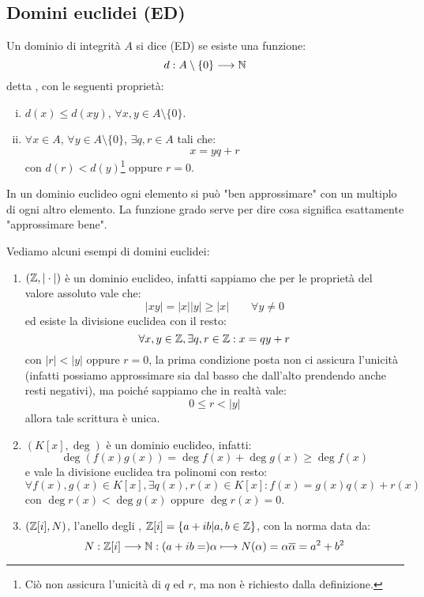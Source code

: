 \documentclass[11pt]{scrartcl}
\begin{document}
\newpage
\subsection{Domini euclidei (ED)}
\begin{definition}
    Un dominio di integrità $A$ si dice  (ED) se esiste una funzione:
    \[ d : A \setminus\{0\} \longrightarrow \mathbb N
        \]
    detta , con le seguenti proprietà:
    \begin{enumerate}[(i)]
        \item $d(x) \leq d(xy)$, $\forall x,y \in A \setminus\{0\}$.
        \item $\forall x \in A$, $\forall y \in A \setminus\{0\}$, $\exists q,r \in A$ tali che:
        \[ x = yq+r
            \]
        con $d(r) < d(y)$\footnote{Ciò non assicura l'unicità di $q$ ed $r$, ma non è richiesto dalla definizione.} oppure $r = 0$.
    \end{enumerate}
\end{definition}

\begin{remark}
    In un dominio euclideo ogni elemento si può "ben approssimare" con un multiplo di ogni altro elemento. La funzione
    grado serve per dire cosa significa esattamente "approssimare bene".
\end{remark}

\begin{example}
    Vediamo alcuni esempi di domini euclidei:
    \begin{enumerate}[(1)]
        \item $(\mathbb Z, |\cdot|)$ è un dominio euclideo, infatti sappiamo che per le proprietà del valore assoluto vale che:
        \[ |xy| = |x||y| \geq |x| \qquad \forall y \ne 0
            \]
        ed esiste la divisione euclidea con il resto:
        \[ \forall x,y \in \mathbb Z, \exists q,r \in \mathbb Z: x = qy + r
            \]
        con $|r| < |y|$ oppure $r = 0$, la prima condizione posta non ci assicura l'unicità (infatti possiamo approssimare sia dal basso che dall'alto 
        prendendo anche resti negativi), ma poiché sappiamo che in realtà vale:
        \[ 0 \leq r < |y|
            \]
        allora tale scrittura è unica.
        \item $(K[x],\deg)$ è un dominio euclideo, infatti:
        \[ \deg (f(x)g(x)) = \deg f(x) + \deg g(x) \geq \deg f(x)
            \]
        e vale la divisione euclidea tra polinomi con resto:
        \[ \forall f(x),g(x) \in K[x], \exists q(x),r(x)\in K[x] : f(x) = g(x)q(x) + r(x)
            \]
        con $\deg r(x) < \deg g(x)$ oppure $\deg r(x) = 0$.
        \item $(\mathbb Z[i],N)$, l'anello degli , $\mathbb Z[i] = \{a + ib | a,b \in \mathbb Z\}$, con la norma data da:
            \[ N : \mathbb Z[i] \longrightarrow \mathbb N : (a +ib =)\alpha \longmapsto N(\alpha) = \alpha \overline{\alpha} = a^2+b^2
                \]
    \end{enumerate}
\end{example}
\end{document}
